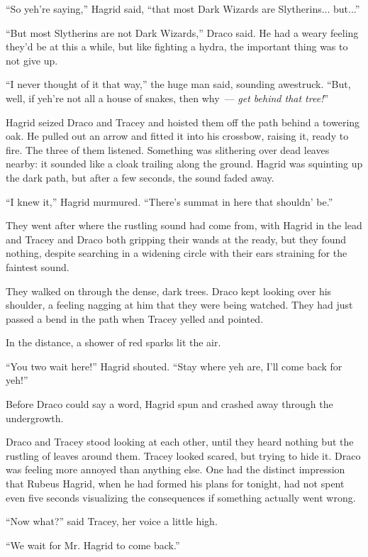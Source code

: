 ``So yeh're saying,'' Hagrid said, ``that most Dark Wizards are Slytherins... but...''

``But most Slytherins are not Dark Wizards,'' Draco said. He had a weary feeling they'd be at this a while, but like fighting a hydra, the important thing was to not give up.

``I never thought of it that way,'' the huge man said, sounding awestruck. ``But, well, if yeh're not all a house of snakes, then why~--- \emph{get behind that tree!}''

Hagrid seized Draco and Tracey and hoisted them off the path behind a towering oak. He pulled out an arrow and fitted it into his crossbow, raising it, ready to fire. The three of them listened. Something was slithering over dead leaves nearby: it sounded like a cloak trailing along the ground. Hagrid was squinting up the dark path, but after a few seconds, the sound faded away.

``I knew it,'' Hagrid murmured. ``There's summat in here that shouldn' be.''

They went after where the rustling sound had come from, with Hagrid in the lead and Tracey and Draco both gripping their wands at the ready, but they found nothing, despite searching in a widening circle with their ears straining for the faintest sound.

They walked on through the dense, dark trees. Draco kept looking over his shoulder, a feeling nagging at him that they were being watched. They had just passed a bend in the path when Tracey yelled and pointed.

In the distance, a shower of red sparks lit the air.

``You two wait here!'' Hagrid shouted. ``Stay where yeh are, I'll come back for yeh!''

Before Draco could say a word, Hagrid spun and crashed away through the undergrowth.

Draco and Tracey stood looking at each other, until they heard nothing but the rustling of leaves around them. Tracey looked scared, but trying to hide it. Draco was feeling more annoyed than anything else. One had the distinct impression that Rubeus Hagrid, when he had formed his plans for tonight, had not spent even five seconds visualizing the consequences if something actually went wrong.

``Now what?'' said Tracey, her voice a little high.

``We wait for Mr. Hagrid to come back.''

